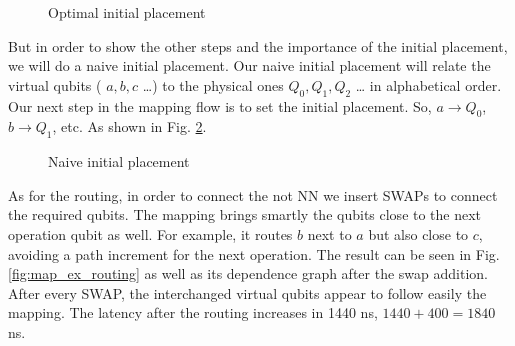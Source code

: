 \begin{figure}[H]
{{
 }
}
\label{fig:map_ex_chip_optim}

\label{fig:optimal_init_place}
\caption{Optimal initial placement}
\end{figure}
But in order to show the other steps and the importance of the initial placement, we will do a naive initial placement.
Our naive initial placement will relate the virtual qubits ( \(a, b, c\) \ldots{}) to the physical ones \(Q_0, Q_1, Q_2\) \ldots{} in alphabetical order.
Our next step in the mapping flow is to set the initial placement.
So, \(a \to Q_0\), \(b \to Q_1\), etc.
As shown in Fig. \ref{fig:map_ex_wrong_init}.



\begin{figure}[H]
\centering
{}
\label{fig:map_ex_circ_wrong}

\label{fig:map_ex_chip_wrong}

\label{fig:map_ex_wrong_init}
\caption{Naive initial placement}
\end{figure}
As for the routing, in order to connect the not NN we insert SWAPs to connect the required qubits.
The mapping brings smartly the qubits close to the next operation qubit as well.
For example, it routes \(b\) next to \(a\) but also close to \(c\), avoiding a path increment for the next operation.
The result can be seen in Fig. \ref{fig:map_ex_routing} as well as its dependence graph after the swap addition.
After every SWAP, the interchanged virtual qubits appear to follow easily the mapping.
The latency after the routing increases in 1440 ns, \(1440 + 400 = 1840\) ns.


